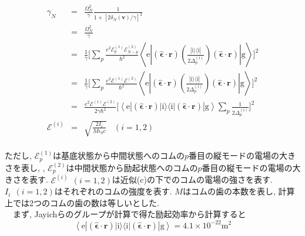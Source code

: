 \documentclass[uplatex, dvipdfmx, a4paper, report, papersize, 11pt]{jsbook}
\begin{document}
\begin{eqnarray}\label{approx_ex-rate}
  \gamma_N &=& \frac{\Omega^2_N}{\gamma}\frac{1}{1 + [2\delta_N(\bm{v})/\gamma]^2} \nonumber\\
  &=& \frac{\Omega^2_N}{\gamma}  \nonumber\\
  &=& \frac{1}{\gamma} \Biggl[ \sum _ { p } \frac { e ^ { 2 } \mathcal { E } ^{(1)}_ { p } \mathcal { E }^{(2)} _ { N - p } } { \hbar ^ { 2 } } \left\langle \mathrm { e } \left| ( \hat { \boldsymbol { \epsilon } } \cdot \mathbf { r } ) \left(  \frac { | \mathrm { i } \rangle \langle \mathrm { i } | } { 2 \Delta _ { p } ^ { ( \mathrm { i } ) } } \right) ( \hat { \boldsymbol { \epsilon } } \cdot \mathbf { r } ) \right| \mathrm { g } \right\rangle \Biggr]^2 \nonumber \\
  &=& \frac{1}{\gamma} \Biggl[ \sum _ { p } \frac { e ^ { 2 } \mathcal { E }^{(1)} \mathcal { E } ^ {(2)} } { \hbar ^ { 2 } } \left\langle \mathrm { e } \left| ( \hat { \boldsymbol { \epsilon } } \cdot \mathbf { r } ) \left(  \frac { | \mathrm { i } \rangle \langle \mathrm { i } | } { 2 \Delta _ { p } ^ { ( \mathrm { i } ) } } \right) ( \hat { \boldsymbol { \epsilon } } \cdot \mathbf { r } ) \right| \mathrm { g } \right\rangle \Biggr]^2 \nonumber \\
  &=& \frac{e^2  \mathcal { E } ^ {(1)} \mathcal { E } ^ {(2)}}{ 2 \gamma \hbar ^ { 2 }  }\Biggl[ \left\langle \mathrm { e } \left| ( \hat { \boldsymbol { \epsilon } } \cdot \mathbf { r } ) | \mathrm { i } \rangle \langle \mathrm { i } |  ( \hat { \boldsymbol { \epsilon } } \cdot \mathbf { r } ) \right| \mathrm { g } \right\rangle\sum _ { p }\frac{1}{2 \Delta _ { p } ^ { ( \mathrm { i } ) }} \Biggr]^2\\
  \mathcal{E}^{(i)} &=&  \sqrt{\frac{2 I_{i}}{M \epsilon_0 c}}\ \ \ \ (i = 1,2)
\end{eqnarray}\\
ただし, $\mathcal{E}^{(1)}_p$は基底状態から中間状態へのコムの$p$番目の縦モードの電場の大きさを表し, , $\mathcal{E}^{(2)}_p$は中間状態から励起状態へのコムの$p$番目の縦モードの電場の大きさを表す. $\mathcal{E}^{(i)}\ \ (i = 1,2)$は近似(c)の下でのコムの電場の強さを表す. $I_{i}\ \ (i = 1,2)$はそれぞれのコムの強度を表す. $M$はコムの歯の本数を表し, 計算上では2つのコムの歯の数は等しいとした. \\
　まず, Jayichらのグループが計算で得た励起効率から計算すると
\begin{equation}
\left\langle \mathrm { e } \left| ( \hat { \boldsymbol { \epsilon } } \cdot \mathbf { r } ) | \mathrm { i } \rangle \langle \mathrm { i } |  ( \hat { \boldsymbol { \epsilon } } \cdot \mathbf { r } ) \right| \mathrm { g } \right\rangle = 4.1 \times 10^{-22}　\mathrm{m^2}
\end{equation}
\end{document}
